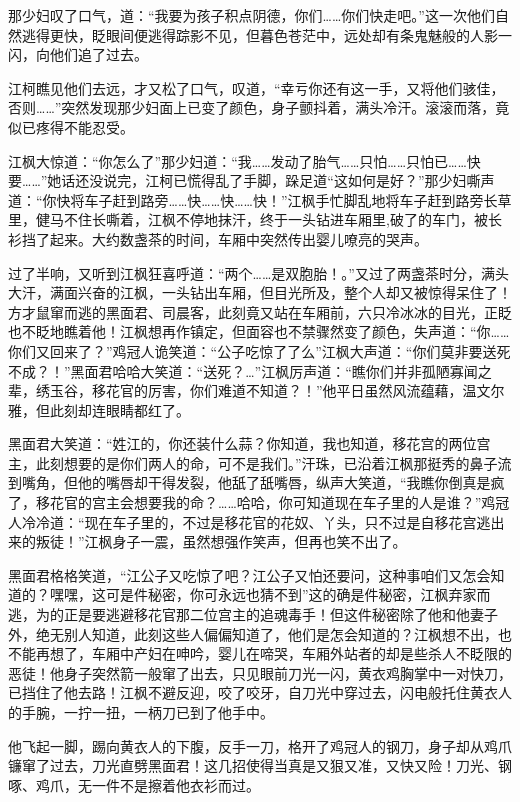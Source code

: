 \documentclass[12pt,oneside]{book}
\begin{document}
那少妇叹了口气，道：``我要为孩子积点阴德，你们\ldots\ldots 你们快走吧。''这一次他们自然逃得更快，眨眼间便逃得踪影不见，但暮色苍茫中，远处却有条鬼魅般的人影一闪，向他们追了过去。

江柯瞧见他们去远，才又松了口气，叹道，``幸亏你还有这一手，又将他们骇佳，否则\ldots\ldots{}''突然发现那少妇面上已变了颜色，身子颤抖着，满头冷汗。滚滚而落，竟似已疼得不能忍受。

江枫大惊道：``你怎么了''那少妇道：``我\ldots\ldots 发动了胎气\ldots\ldots 只怕\ldots\ldots 只怕已\ldots\ldots 快要\ldots\ldots{}''她话还没说完，江柯已慌得乱了手脚，跺足道``这如何是好？''那少妇嘶声道：``你快将车子赶到路旁\ldots\ldots 快\ldots\ldots 快\ldots\ldots 快！''江枫手忙脚乱地将车子赶到路旁长草里，健马不住长嘶着，江枫不停地抹汗，终于一头钻进车厢里,破了的车门，被长衫挡了起来。大约数盏茶的时间，车厢中突然传出婴儿嘹亮的哭声。

过了半响，又听到江枫狂喜呼道：``两个\ldots\ldots 是双胞胎！。''又过了两盏茶时分，满头大汗，满面兴奋的江枫，一头钻出车厢，但目光所及，整个人却又被惊得呆住了！方才鼠窜而逃的黑面君、司晨客，此刻竟又站在车厢前，六只冷冰冰的目光，正眨也不眨地瞧着他！江枫想再作镇定，但面容也不禁骤然变了颜色，失声道：``你\ldots\ldots 你们又回来了？''鸡冠人诡笑道：``公子吃惊了了么''江枫大声道：``你们莫非要送死不成？！''黑面君哈哈大笑道：``送死？\ldots{}''江枫厉声道：``瞧你们并非孤陋寡闻之辈，绣玉谷，移花官的厉害，你们难道不知道？！''他平日虽然风流蕴藉，温文尔雅，但此刻却连眼睛都红了。

黑面君大笑道：``姓江的，你还装什么蒜？你知道，我也知道，移花宫的两位宫主，此刻想要的是你们两人的命，可不是我们。''汗珠，已沿着江枫那挺秀的鼻子流到嘴角，但他的嘴唇却干得发裂，他舐了舐嘴唇，纵声大笑道，``我瞧你倒真是疯了，移花官的宫主会想要我的命？\ldots\ldots 哈哈，你可知道现在车子里的人是谁？''鸡冠人冷冷道：``现在车子里的，不过是移花官的花奴、丫头，只不过是自移花宫逃出来的叛徒！''江枫身子一震，虽然想强作笑声，但再也笑不出了。

黑面君格格笑道，``江公子又吃惊了吧？江公子又怕还要问，这种事咱们又怎会知道的？嘿嘿，这可是件秘密，你可永远也猜不到''这的确是件秘密，江枫弃家而逃，为的正是要逃避移花官那二位宫主的追魂毒手！但这件秘密除了他和他妻子外，绝无别人知道，此刻这些人偏偏知道了，他们是怎会知道的？江枫想不出，也不能再想了，车厢中产妇在呻吟，婴儿在啼哭，车厢外站者的却是些杀人不眨限的恶徒！他身子突然箭一般窜了出去，只见眼前刀光一闪，黄衣鸡胸掌中一对快刀，已挡住了他去路！江枫不避反迎，咬了咬牙，自刀光中穿过去，闪电般托住黄衣人的手腕，一拧一扭，一柄刀已到了他手中。

他飞起一脚，踢向黄衣人的下腹，反手一刀，格开了鸡冠人的钢刀，身子却从鸡爪镰窜了过去，刀光直劈黑面君！这几招使得当真是又狠又准，又快又险！刀光、钢啄、鸡爪，无一件不是擦着他衣衫而过。
\end{document}
